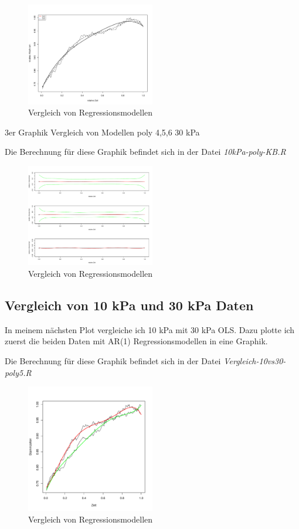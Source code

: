 \documentclass[12pt,a4paper]{article}
\theoremstyle{definition}
\theoremstyle{definition}
\theoremstyle{definition}
\begin{document}
\begin{figure}[H] 
  \centering
     \includegraphics[width=0.5\textwidth]{10kPa-poly.pdf}
  \caption{Vergleich von Regressionsmodellen}
  \label{fig:13}
\end{figure}

3er Graphik Vergleich von Modellen poly 4,5,6 30 kPa

Die Berechnung für diese Graphik befindet sich in der Datei \textit{10kPa-poly-KB.R}

\begin{figure}[H] 
  \centering
     \includegraphics[width=0.5\textwidth]{10kPa-poly-KB.pdf}
  \caption{Vergleich von Regressionsmodellen}
  \label{fig:14}
\end{figure}



\subsection{Vergleich von 10 kPa und 30 kPa Daten}
In meinem nächsten Plot vergleiche ich 10 kPa mit 30 kPa OLS. Dazu plotte ich zuerst die beiden Daten mit AR(1) Regressionsmodellen in eine Graphik.

Die Berechnung für diese Graphik befindet sich in der Datei \textit{Vergleich-10vs30-poly5.R}

\begin{figure}[H] 
  \centering
     \includegraphics[width=0.5\textwidth]{Vergleich-10vs30-poly5}
  \caption{Vergleich von Regressionsmodellen}
  \label{fig:9}
\end{figure}
\end{document}
